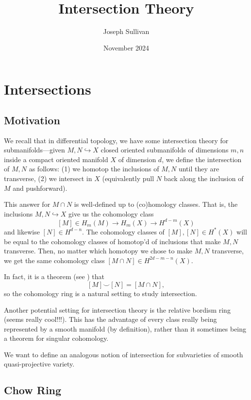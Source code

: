 \documentclass[12pt]{article}
\title{Intersection Theory}
\author{Joseph Sullivan}
\date{November 2024}
\begin{document}
\maketitle

\section{Intersections}

\subsection{Motivation}

We recall that in differential topology, we have some intersection theory for submanifolds---given $M,N\hookrightarrow X$ closed oriented submanifolds of dimensions $m,n$ inside a compact oriented manifold $X$ of dimension $d$, we define the intersection of $M,N$ as follows: (1) we homotop the inclusions of $M,N$ until they are transverse, (2) we intersect in $X$ (equivalently pull $N$ back along the inclusion of $M$ and pushforward).

This answer for $M\cap N$ is well-defined up to (co)homology classes. That is, the inclusions $M,N\hookrightarrow X$ give us the cohomology class
\[[M]\in H_m(M) \to H_m(X) \to H^{d-m}(X)\]
and likewise $[N]\in H^{d-n}$. The cohomology classes of $[M],[N]\in H^*(X)$ will be equal to the cohomology classes of homotop'd of inclusions that make $M,N$ transverse. Then, no matter which homotopy we chose to make $M,N$ transverse, we get the same cohomology class $[M\cap N] \in H^{2d-m-n}(X)$.

In fact, it is a theorem (see \cite{cup_products}) that
\[[M]\smile [N] = [M \cap N],\]
so the cohomology ring is a natural setting to study intersection.

Another potential setting for intersection theory is the relative bordism ring {\color{red} (seems really cool!!!)}. This has the advantage of every class really being represented by a smooth manifold (by definition), rather than it sometimes being a theorem for singular cohomology.

We want to define an analogous notion of intersection for subvarieties of smooth quasi-projective variety. 

\subsection{Chow Ring}
\end{document}
